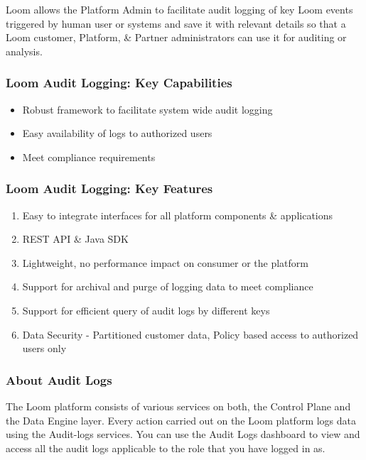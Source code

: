 \documentclass[letterpaper,10pt,english]{sphinxmanual}
\begin{document}
Loom allows the Platform Admin to facilitate audit logging of key Loom  events triggered by human user or systems and save it with relevant details so that a Loom customer, Platform, \& Partner administrators can use it for auditing or analysis.


\subsubsection{Loom Audit Logging: Key Capabilities}
\label{\detokenize{loom_getting_started_guide:loom-audit-logging-key-capabilities}}\begin{itemize}
\item {} 
Robust framework to facilitate system wide audit logging

\item {} 
Easy availability of logs to authorized users

\item {} 
Meet compliance requirements

\end{itemize}


\subsubsection{Loom Audit Logging: Key Features}
\label{\detokenize{loom_getting_started_guide:loom-audit-logging-key-features}}\begin{enumerate}
\item {} 
Easy to integrate interfaces for all platform components \& applications

\item {} 
REST API \& Java SDK

\item {} 
Lightweight, no performance impact on consumer or the platform

\item {} 
Support for archival and purge of logging data to meet compliance

\item {} 
Support for efficient query of audit logs by different keys

\item {} 
Data Security - Partitioned customer data, Policy based access to authorized users only

\end{enumerate}


\subsubsection{About Audit Logs}
\label{\detokenize{loom_getting_started_guide:about-audit-logs}}\label{\detokenize{loom_getting_started_guide:content-loom-audit-logging}}
The Loom platform consists of various services on both, the Control Plane and the Data Engine layer. Every action carried out on the Loom platform logs data using the Audit-logs services. You can use the Audit Logs dashboard to view and access all the audit logs applicable to the role that you have logged in as.
\end{document}
